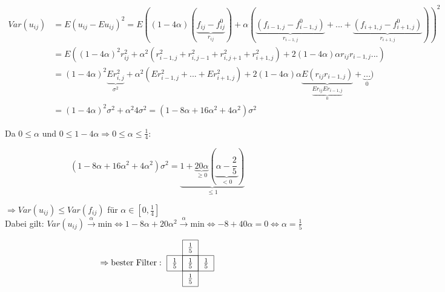 \documentclass{article}
\theoremstyle{plain}
\theoremstyle{definition}
\numberwithin{equation}{section}
\begin{document}
    \begin{align*}
        Var(u_{ij}) &= E(u_{ij} - E u_{ij})^2 = E((1 - 4 \alpha) (\underbrace{f_{ij} - f^0_{ij}}_{r_{ij}}) + \alpha(\underbrace{(f_{i-1,j} - f^0_{i-1,j})}_{r_{i-1,j}} + ... + \underbrace{(f_{i+1,j} - f^0_{i+1,j})}_{r_{i+1,j}}))^2\\
        &= E((1 - 4 \alpha)^2 r_{ij}^2 + \alpha^2(r_{i-1,j}^2 + r_{i,j-1}^2 +r_{i,j+1}^2 + r_{i+1,j}^2) + 2 (1 - 4 \alpha) \alpha r_{ij} r_{i-1,j}...)\\%
        &= (1 - 4 \alpha)^2 \underbrace{E r_{i,j}^2}_{\sigma^2} + \alpha^2(E r_{i-1,j}^2 + ... + E r_{i+1,j}^2) + 2 (1 - 4 \alpha) \alpha \underbrace{E(r_{ij}r_{i-1,j})}_{\underbrace{E r_{ij} E r_{i-1,j}}_{0}} + \underbrace{...}_{0})\\
        &=(1 - 4 \alpha)^2 \sigma^2 + \alpha^2 4 \sigma^2 = (1 - 8 \alpha + 16 \alpha ^2 + 4 \alpha^2) \sigma^2
    \end{align*}

    Da $0 \leq \alpha$ und $ 0 \leq 1 - 4 \alpha \Rightarrow 0 \leq \alpha \leq \frac{1}{4}$:

    \begin{equation*}
        (1 - 8 \alpha + 16 \alpha ^2 + 4 \alpha^2) \sigma^2 = \underbrace{1 + \underbrace{20 \alpha}_{\geq 0} (\underbrace{\alpha - \frac{2}{5}}_{< 0})}_{\leq 1}
    \end{equation*}

    $\Rightarrow Var(u_{ij}) \leq Var(f_{ij})$ für $\alpha \in [0,\frac{1}{4}]$\\

    Dabei gilt: $Var(u_{ij}) \overset{\alpha}{\to} \text{min} \iff 1 - 8 \alpha + 20 \alpha^2 \overset{\alpha}{\to} \text{min} \iff -8 + 40 \alpha = 0 \iff \alpha = \frac{1}{5}$

    \begin{equation*}
        \Rightarrow \text{bester Filter} : \ \raisebox{-0.9cm}{\begin{tikzpicture}[scale = 1.3]
                \draw[step = 0.5] (0,0) grid (0.5,1.5);
                \draw[step = 0.5] (-0.5,1) grid (1,0.5);
                \draw (0.25,1.25) node {$\frac{1}{5}$};
                \draw (0.25,0.75) node {$\frac{1}{5}$};
                \draw (0.25,0.25) node {$\frac{1}{5}$};
                \draw (-0.25,0.75) node {$\frac{1}{5}$};
                \draw (0.75,0.75) node {$\frac{1}{5}$};
            \end{tikzpicture}}
        \end{equation*}
\end{document}
